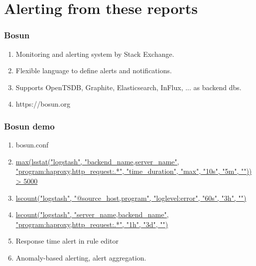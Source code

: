 \documentclass[13pt, ignorenonframetext]{beamer}
\begin{document}
\section{Alerting from these reports}
\begin{frame}
\frametitle{Bosun}
\begin{enumerate}
\item Monitoring and alerting system by Stack Exchange.
\item Flexible language to define alerts and notifications.
\item Supports OpenTSDB, Graphite, Elasticsearch, InFlux, ... as backend dbs.
\item https://bosun.org
\end{enumerate}
\end{frame}


\begin{frame}
\frametitle{Bosun demo}
\begin{enumerate}
\item bosun.conf
\item \url{max(lsstat("logstash", "backend\_name,server\_name", "program:haproxy,http\_request:.*", "time\_duration", "max", "10s", "5m", "")) > 5000}
\item \url{lscount("logstash", "@source\_host,program", "loglevel:error", "60s", "3h", "")}
\item \url{lscount("logstash", "server\_name,backend\_name", "program:haproxy,http\_request:.*", "1h", "3d", "")}
\item Response time alert in rule editor
\item Anomaly-based alerting, alert aggregation.
\end{enumerate}
\end{frame}
\end{document}

